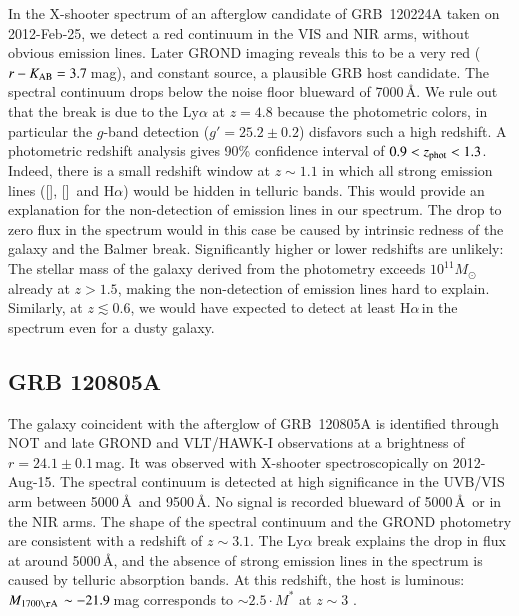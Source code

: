 \documentclass[traditabstract, longauth]{aa}
\newcommand{\ha}{H$\alpha$}
\newcommand{\oii}{[\ion{O}{ii}]}
\newcommand{\oiii}{[\ion{O}{iii}]}
\newcommand{\Msun}{$M_\odot$}
\begin{document}
\begin{appendix}
In the X-shooter spectrum  \citep{2012GCN..12991...1W} of an afterglow candidate of GRB~120224A \citep{2012GCN..12980...1S} taken on 2012-Feb-25, we detect a red continuum in the VIS and NIR arms, without obvious emission lines. Later GROND imaging reveals this to be a very red ($r-K_{\rm{AB}}=3.7$\,mag), and constant source, a plausible GRB host candidate. The spectral continuum drops below the noise floor blueward of 7000\,\AA. We rule out that the break is due to the Ly$\alpha$ at $z=4.8$ because the photometric colors, in particular the $g$-band detection ($g'=25.2\pm0.2$) disfavors such a high redshift. A photometric redshift analysis gives 90\% confidence interval of $0.9 < z_{\rm{phot}} < 1.3$. Indeed, there is a small redshift window at $z\sim1.1$ in which all strong emission lines (\oii, \oiii\, and \ha) would be hidden in telluric bands. This would provide an explanation for the non-detection of emission lines in our spectrum. The drop to zero flux in the spectrum would in this case be caused by intrinsic redness of the galaxy and the Balmer break. Significantly higher or lower redshifts are unlikely: The stellar mass of the galaxy derived from the photometry exceeds $10^{11}$\Msun\,already at $z > 1.5$, making the non-detection of emission lines hard to explain. Similarly, at $z \lesssim 0.6$, we would have expected to detect at least \ha\,in the spectrum even for a dusty galaxy.

\subsection{GRB 120805A}

The galaxy coincident with the afterglow \citep{2012GCN..13651...1G, 2012GCN..13591...1G} of GRB~120805A \citep{2012GCN..13588...1T} is identified through NOT \citep{2012GCN..13639...1M} and late GROND and VLT/HAWK-I observations at a brightness of $r=24.1\pm0.1$\,mag. It was observed with X-shooter spectroscopically on 2012-Aug-15. The spectral continuum is detected at high significance in the UVB/VIS arm between 5000\,\AA\, and 9500\,\AA. No signal is recorded blueward of 5000\,\AA\, or in the NIR arms. The shape of the spectral continuum and the GROND photometry are consistent with a redshift of $z\sim3.1$. The Ly$\alpha$ break explains the drop in flux at around 5000\,\AA, and the absence of strong emission lines in the spectrum is caused by telluric absorption bands. At this redshift, the host is luminous: $M_{\rm1700\AA\,}\sim-21.9$\,mag corresponds to $\sim2.5\cdot M^{*}$ at $z\sim3$ \citep[e.g.,][]{2009ApJ...692..778R}.


\end{appendix}
\end{document}
